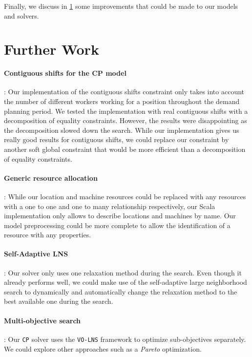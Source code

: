 \documentclass[../thesis.tex]{subfiles}
\begin{document}
Finally, we discuss in \ref{further-work} some improvements that could be made to our models and solvers.

\section{Further Work}
\label{further-work}

\paragraph{Contiguous shifts for the CP model}: Our implementation of the contiguous shifts constraint only takes into account 
the number of different workers working for a position throughout the demand planning period.
We tested the implementation with real contiguous shifts with a decomposition of equality constraints. However, the results 
were disappointing as the decomposition slowed down the search. While our implementation gives us really good results for contiguous shifts,
we could replace our constraint by another soft global constraint that would be more efficient than 
a decomposition of equality constraints.

\paragraph{Generic resource allocation}: While our location and machine resources could be replaced with 
any resources with a one to one and one to many relationship respectively, our Scala implementation only allows to describe
locations and machines by name. Our model preprocessing could be more complete to allow the identification of a resource with any properties.

\paragraph{Self-Adaptive LNS}: Our solver only uses one relaxation method during the search. 
Even though it already performs well, we could make 
use of the self-adaptive large neighborhood search \cite{thomas:adaptive} to dynamically 
and automatically change the relaxation method to the best available one during the search.

\paragraph{Multi-objective search}: Our \texttt{CP} solver uses the \texttt{VO-LNS} framework to optimize sub-objectives separately.
We could explore other approaches such as a \emph{Pareto} optimization.  
\end{document}
